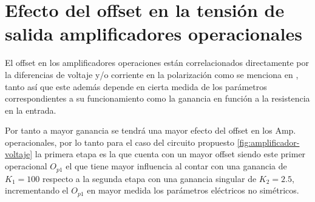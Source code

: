 \section*{Efecto del offset en la tensión de salida amplificadores operacionales}

El offset en los amplificadores operaciones están correlacionados directamente por la diferencias de voltaje y/o corriente en la polarización como se menciona en \cite{instrumentacion_electronica}, tanto así que este además depende en cierta medida de los parámetros correspondientes a su funcionamiento como la ganancia en función a la resistencia en la entrada.

Por tanto a mayor ganancia se tendrá una mayor efecto del offset en los Amp. operacionales, por lo tanto para el caso del circuito propuesto \ref{fig:amplificador-voltaje} la primera etapa es la que cuenta con un mayor offset siendo este primer operacional $O_{p1}$ el que tiene mayor influencia al contar con una ganancia de $K_1 = 100$ respecto a la segunda etapa con una ganancia singular de $K_2 = 2.5$, incrementando el $O_{p1}$ en mayor medida los parámetros eléctricos no simétricos.